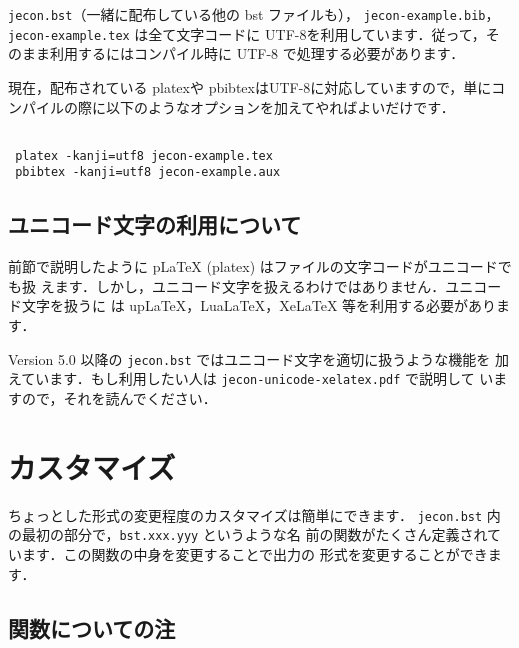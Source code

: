 \documentclass[a4j,10pt]{jarticle}
\begin{document}
\texttt{jecon.bst}（一緒に配布している他の bst ファイルも），
\texttt{jecon-example.bib}，\texttt{jecon-example.tex} は全て文字コードに
UTF-8を利用しています．従って，そのまま利用するにはコンパイル時に UTF-8
で処理する必要があります．

現在，配布されている platexや pbibtexはUTF-8に対応していますので，単にコ
ンパイルの際に以下のようなオプションを加えてやればよいだけです．
\begin{screen}
 \begin{verbatim}

 platex -kanji=utf8 jecon-example.tex
 pbibtex -kanji=utf8 jecon-example.aux
 \end{verbatim}
\end{screen}

\subsection{ユニコード文字の利用について}

前節で説明したように p\LaTeX{} (platex) はファイルの文字コードがユニコードでも扱
えます．しかし，ユニコード文字を扱えるわけではありません．ユニコード文字を扱うに
は upLaTeX，LuaLaTeX，XeLaTeX 等を利用する必要があります．

Version 5.0 以降の \texttt{jecon.bst} ではユニコード文字を適切に扱うような機能を
加えています．もし利用したい人は \texttt{jecon-unicode-xelatex.pdf} で説明して
いますので，それを読んでください．



\section{カスタマイズ}

ちょっとした形式の変更程度のカスタマイズは簡単にできます．
\texttt{jecon.bst} 内の最初の部分で，\texttt{bst.xxx.yyy} というような名
前の関数がたくさん定義されています．この関数の中身を変更することで出力の
形式を変更することができます．

\subsection{関数についての注}
\end{document}
